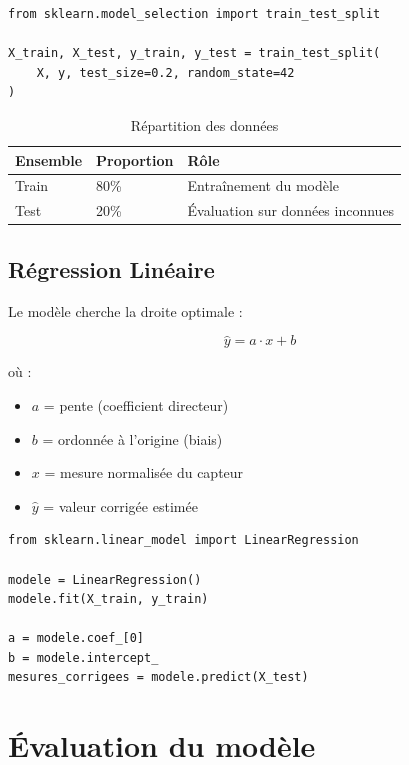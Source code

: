 \documentclass[12pt, a4paper]{article}
\begin{document}
\begin{lstlisting}[style=python, caption=Séparation train/test]
from sklearn.model_selection import train_test_split

X_train, X_test, y_train, y_test = train_test_split(
    X, y, test_size=0.2, random_state=42
)
\end{lstlisting}

\begin{table}[H]
    \centering
    \caption{Répartition des données}
    \begin{tabular}{@{}lll@{}}
        \toprule
        \textbf{Ensemble} & \textbf{Proportion} & \textbf{Rôle} \\
        \midrule
        Train & 80\% & Entraînement du modèle \\
        Test  & 20\% & Évaluation sur données inconnues \\
        \bottomrule
    \end{tabular}
\end{table}

\subsection{Régression Linéaire}
Le modèle cherche la droite optimale :

\begin{equation}
    \hat{y} = a \cdot x + b
\end{equation}

où :
\begin{itemize}
    \item $a$ = pente (coefficient directeur)
    \item $b$ = ordonnée à l'origine (biais)
    \item $x$ = mesure normalisée du capteur
    \item $\hat{y}$ = valeur corrigée estimée
\end{itemize}

\begin{lstlisting}[style=python, caption=Entraînement du modèle]
from sklearn.linear_model import LinearRegression

modele = LinearRegression()
modele.fit(X_train, y_train)

a = modele.coef_[0]
b = modele.intercept_
mesures_corrigees = modele.predict(X_test)
\end{lstlisting}

\section{Évaluation du modèle}
\end{document}

